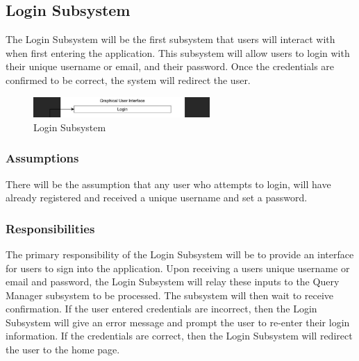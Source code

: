 
\subsection{Login Subsystem}
The Login Subsystem will be the first subsystem that users will interact with when first entering the application. This subsystem will allow users to login with their unique username or email, and their password. Once the credentials are confirmed to be correct, the system will redirect the user. 

\begin{figure}[h!]
	\centering
 	\includegraphics[width=0.60\textwidth]{images/login}
 \caption{Login Subsystem}
\end{figure}

\subsubsection{Assumptions}
There will be the assumption that any user who attempts to login, will have already registered and received a unique username and set a password.

\subsubsection{Responsibilities}
The primary responsibility of the Login Subsystem will be to provide an interface for users to sign into the application. Upon receiving a users unique username or email and password, the Login Subsystem will relay these inputs to the Query Manager subsystem to be processed. The subsystem will then wait to receive confirmation. If the user entered credentials are incorrect, then the Login Subsystem will give an error message and prompt the user to re-enter their login information. If the credentials are correct, then the Login Subsystem will redirect the user to the home page.

